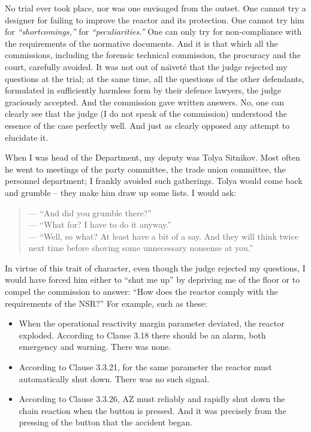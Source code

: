 \documentclass[openright]{bookest}
\begin{document}
No trial ever took place, nor was one envisaged from the outset. One cannot try a designer for failing to improve the reactor and its protection. One cannot try him for \textit{``shortcomings,''} for \textit{``peculiarities.''} One can only try for non-compliance with the requirements of the normative documents. And it is that which all the commissions, including the forensic technical commission, the procuracy and the court, carefully avoided. It was not out of na\"{\i}vet\'e that the judge rejected my questions at the trial; at the same time, all the questions of the other defendants, formulated in sufficiently harmless form by their defence lawyers, the judge graciously accepted. And the commission gave written answers. No, one can clearly see that the judge (I do not speak of the commission) understood the essence of the case perfectly well. And just as clearly opposed any attempt to elucidate it.

When I was head of the Department, my deputy was Tolya Sitnikov. Most often he went to meetings of the party committee, the trade union committee, the personnel department; I frankly avoided such gatherings. Tolya would come back and grumble -- they make him draw up some lists. I would ask:

\begin{quote}
--- ``And did you grumble there?'' \\
--- ``What for? I have to do it anyway.'' \\
--- ``Well, so what? At least have a bit of a say. And they will think twice next time before shoving some unnecessary nonsense at you.''
\end{quote}

In virtue of this trait of character, even though the judge rejected my questions, I would have forced him either to ``shut me up'' by depriving me of the floor or to compel the commission to answer: ``How does the reactor comply with the requirements of the NSR?'' For example, such as these:

\begin{itemize}
\item When the operational reactivity margin parameter deviated, the reactor exploded. According to Clause 3.18 there should be an alarm, both emergency and warning. There was none.
\item According to Clause 3.3.21, for the same parameter the reactor must automatically shut down. There was no such signal.
\item According to Clause 3.3.26, AZ must reliably and rapidly shut down the chain reaction when the button is pressed. And it was precisely from the pressing of the button that the accident began.
\end{itemize}
\end{document}
